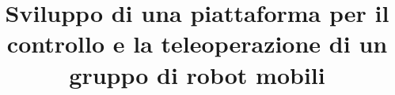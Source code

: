 \documentclass[12pt,a4paper,twoside,openright]{book}
\begin{document}

\title{Sviluppo di una piattaforma per il controllo e la teleoperazione di un gruppo di robot mobili}
\providecommand{\autore}{Filippo Bertoncelli}            %
\providecommand{\principaladviser}{Prof. Cristian Secchi}  %
\providecommand{\firstreader}{Prof. Lorenzo Sabattini}            %
\providecommand{\annoacc}{2014/2015}
\providecommand{\corso}{\uppercase{Meccatronica}} %




\frontmatter

   
   \tableofcontents


\mainmatter
      
      
      
      


\appendix
\renewcommand{\chaptermark}[1]{\markboth{{\appendixname}\ \thechapter.\hspace{1em}#1}{}}

      

\cleardoublepage
{}


\end{document}
